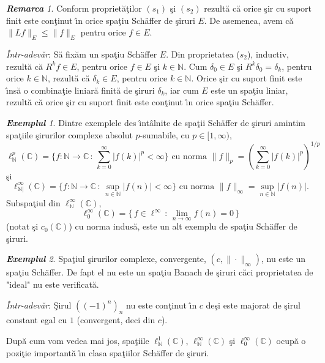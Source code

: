\documentclass[ a4paper, 12pt]{report}
\newcommand{\C}{\mathbb{C}}
\newcommand{\N}{\mathbb{N}}
\theoremstyle{definition}
\theoremstyle{remark}
\newtheorem{remarc}{\bf Remarca}[section]
\newtheorem{exemple}{\bf Exemplul}[section]
\numberwithin{equation}{section}
\begin{document}
\begin{remarc}
Conform propriet\u a\c tilor $(s_1)$ \c si $(s_2)$  rezult\u a c\u a  orice \c sir cu suport finit este con\c tinut \^\i n orice spa\c tiu Sch\"{a}ffer de \c siruri $E$.
De asemenea, avem c\u a $\|Lf\|_{E}\leq\|f\|_{E}$ pentru orice $f\in E$.
\end{remarc}

{\it \^ Intr-adev\u ar}: S\u a fix\u am un spa\c tiu Sch\" affer $E$. Din proprietatea ($s_2$), inductiv, rezult\u a c\u a $R^k f \in E$, pentru orice $f \in E$ \c si $k \in \N$. Cum $\delta_0\in E$ \c si $R^k \delta_0 = \delta_k$, pentru orice $k \in \N$, rezult\u a c\u a $\delta_k \in E$, pentru orice $k \in \N$. Orice \c sir cu suport finit este \^\i ns\u a o combina\c tie liniar\u a finit\u a de \c siruri $\delta_k$, iar cum $E$ este un spa\c tiu liniar, rezult\u a c\u a orice \c sir cu suport finit este con\c tinut \^\i n orice spa\c tiu Sch\" affer.


\begin{exemple}
Dintre exemplele des \^\i nt\^ alnite de spa\c tii Sch\"{a}ffer de \c siruri amintim spa\c tiile \c sirurilor complexe absolut $p$-sumabile, cu $p\in[1,\infty)$,
$$\ell^p_{\N}(\C)=\{f:\N\to\C\,:\,\sum_{k=0}^{\infty}|f(k)|^p<\infty\} \text{ cu norma }
    \|f\|_p=\left(\sum_{k=0}^{\infty}|f(k)|^p\right)^{1/p} $$
\c si
$$\ell^{\infty}_{\N|}(\C)=\{f:\N\to\C\,:\,\sup_{n\in\N}|f(n)|<\infty\} \text{ cu norma }
    \|f\|_{\infty}=\sup_{n\in\N}|f(n)|.$$
Subspa\c tiul din $\ell^{\infty}_{\N}(\C)$,
$$\ell_0^{\infty}(\C)=\{\,f\in\ell^{\infty}\,:\,\lim_{n\to\infty}f(n)=0\,\}$$
(notat \c si $c_0(\C)$) cu norma indus\u a, este un alt exemplu de spa\c tiu Sch\"{a}ffer de \c siruri.
\end{exemple}

\begin{exemple}
Spa\c tiul \c sirurilor complexe, convergente, $(c, \| \cdot \|_\infty)$, nu este un spa\c tiu Sch\" affer. De fapt el nu este un spa\c tiu Banach de \c siruri c\u aci proprietatea de "ideal" nu este verificat\u a.
\end{exemple}
{\it \^ Intr-adev\u ar}: \c Sirul $((- 1)^n)_n$ nu este con\c tinut \^\i n $c$ de\c si este majorat de \c sirul constant egal cu $1$ (convergent, deci din $c$).

\medskip

Dup\u a cum vom vedea mai jos, spa\c tiile $\ell^1_{\N}(\C)$, $\ell^{\infty}_{\N}(\C)$ \c si  $\ell_0^{\infty}(\C)$ ocup\u a o pozi\c tie important\u a \^\i n clasa spa\c tiilor Sch\"{a}ffer de \c siruri.
\end{document}
